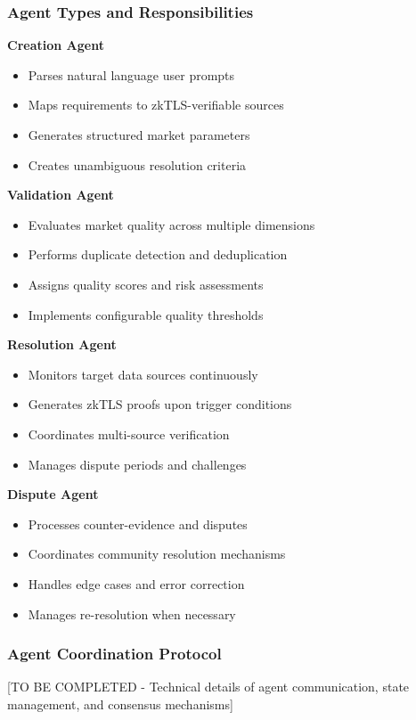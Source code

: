 \documentclass[11pt,a4paper]{article}
\begin{document}
\subsubsection{Agent Types and Responsibilities}

\textbf{Creation Agent}
\begin{itemize}
    \item Parses natural language user prompts
    \item Maps requirements to zkTLS-verifiable sources
    \item Generates structured market parameters
    \item Creates unambiguous resolution criteria
\end{itemize}

\textbf{Validation Agent}
\begin{itemize}
    \item Evaluates market quality across multiple dimensions
    \item Performs duplicate detection and deduplication
    \item Assigns quality scores and risk assessments
    \item Implements configurable quality thresholds
\end{itemize}

\textbf{Resolution Agent}
\begin{itemize}
    \item Monitors target data sources continuously
    \item Generates zkTLS proofs upon trigger conditions
    \item Coordinates multi-source verification
    \item Manages dispute periods and challenges
\end{itemize}

\textbf{Dispute Agent}
\begin{itemize}
    \item Processes counter-evidence and disputes
    \item Coordinates community resolution mechanisms
    \item Handles edge cases and error correction
    \item Manages re-resolution when necessary
\end{itemize}

\subsubsection{Agent Coordination Protocol}
[TO BE COMPLETED - Technical details of agent communication, state management, and consensus mechanisms]
\end{document}
